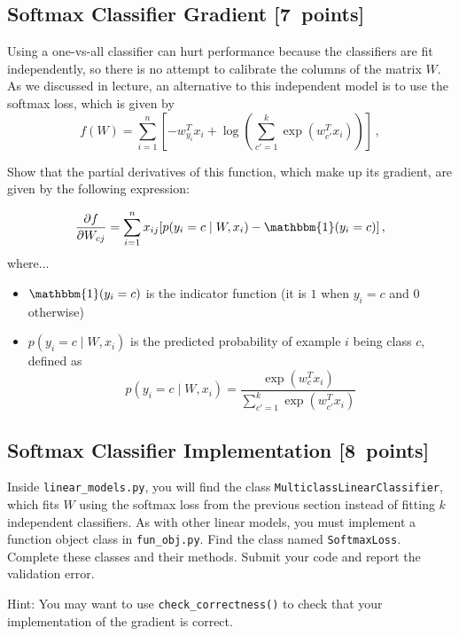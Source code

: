 \documentclass{article}
\newcommand{\blu}[1]{{\textcolor{blu}{#1}}}
\let\ask\blu
\newcommand\pts[1]{\textcolor{pointscolour}{[#1~points]}}
\begin{document}
\subsection{Softmax Classifier Gradient \pts{7}}

Using a one-vs-all classifier can hurt performance because the classifiers are fit independently, so there is no attempt to calibrate the columns of the matrix $W$. As we discussed in lecture, an alternative to this independent model is to use the softmax loss, which is given by
\[
f(W) = \sum_{i=1}^n \left[-w_{y_i}^Tx_i + \log\left(\sum_{c' = 1}^k \exp(w_{c'}^Tx_i)\right)\right] \, ,
\]

\ask{Show that the partial derivatives of this function, which make up its gradient, are given by the following expression:}

\[
\frac{\partial f}{\partial W_{cj}} = \sum_{i=1}^n x_{ij}[p(y_i=c \mid W,x_i) - \mathbbm{1}(y_i = c)] \, ,
\]
where...
\begin{itemize}
\item $\mathbbm{1}(y_i = c)$ is the indicator function (it is $1$ when $y_i=c$ and $0$ otherwise)
\item $p(y_i=c \mid W, x_i)$ is the predicted probability of example $i$ being class $c$, defined as
\[
p(y_i=c \mid W, x_i) = \frac{\exp(w_c^Tx_i)}{\sum_{c'=1}^k\exp(w_{c'}^Tx_i)}
\]



\end{itemize}

\subsection{Softmax Classifier Implementation \pts{8}}

Inside \verb|linear_models.py|, you will find the class \verb|MulticlassLinearClassifier|, which fits $W$ using the softmax loss from the previous section instead of fitting $k$ independent classifiers. As with other linear models, you must implement a function object class in \verb|fun_obj.py|. Find the class named \verb|SoftmaxLoss|. Complete these classes and their methods. \ask{Submit your code and report the validation error.}

Hint: You may want to use \verb|check_correctness()| to check that your implementation of the gradient is correct.
\end{document}
